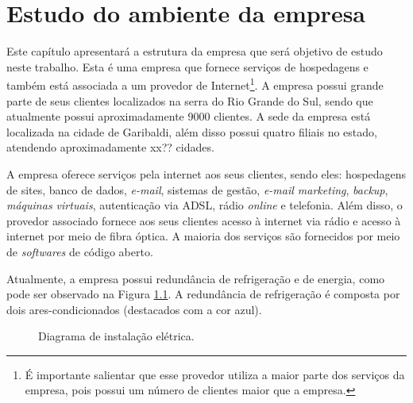 \chapter{Estudo do ambiente da empresa}
\label{cap:estudodecaso}

Este capítulo apresentará a estrutura da empresa que será objetivo de estudo neste trabalho. Esta é uma empresa que fornece serviços de 
hospedagens e também está associada a um provedor de Internet\footnote[1]{É importante salientar que esse provedor utiliza a maior parte dos 
serviços da empresa, pois possui um número de clientes maior que a empresa.}. A empresa possui grande parte de seus clientes localizados na 
serra do Rio Grande do Sul, sendo que atualmente possui aproximadamente 9000 clientes. A sede da empresa está localizada na cidade de 
Garibaldi, além disso possui quatro filiais no estado, atendendo aproximadamente xx?? cidades.

A empresa oferece serviços pela internet aos seus clientes, sendo eles: hospedagens de sites, banco de dados, \textit{e-mail}, sistemas de gestão, 
\textit{e-mail marketing}, \textit{backup}, \textit{máquinas virtuais}, autenticação via \ac{ADSL}, rádio \textit{online} e telefonia.
Além disso, o provedor associado fornece aos seus clientes acesso à internet via rádio e acesso à internet por meio de fibra óptica.
A maioria dos serviços são fornecidos por meio de \textit{softwares} de código aberto.

Atualmente, a empresa possui redundância de refrigeração e de energia, como pode ser observado na Figura \ref{fig:insteletrica}. 
A redundância de refrigeração é composta por dois ares-condicionados (destacados com a cor azul). 

\begin{figure}[h!]
 \centering
 \caption{Diagrama de instalação elétrica.}
 \label{fig:insteletrica}
\end{figure}

